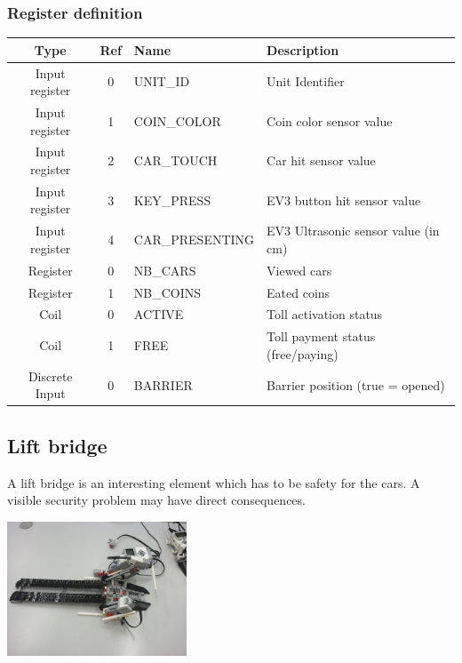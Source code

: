 \documentclass[10pt,a4paper]{article}
\begin{document}
	    \subsubsection{Register definition}
		
			\begin{tabular}{|c|c|l|l|}
			\hline 
			\textbf{Type} & \textbf{Ref} & \textbf{Name} & \textbf{Description} \\ 
			\hline 
			Input register & 0 & UNIT\_ID & Unit Identifier\\ 
			\hline 
			Input register & 1 & COIN\_COLOR & Coin color sensor value\\ 
			\hline 
			Input register & 2 & CAR\_TOUCH & Car hit sensor value\\ 
			\hline 
			Input register & 3 & KEY\_PRESS & EV3 button hit sensor value\\ 
			\hline 
			Input register & 4 & CAR\_PRESENTING & EV3 Ultrasonic sensor value (in cm)\\ 
			\hline 
			Register & 0 & NB\_CARS & Viewed cars\\ 
			\hline 
			Register & 1 & NB\_COINS & Eated coins\\ 
			\hline 
			Coil & 0 & ACTIVE & Toll activation status \\ 
			\hline 
			Coil & 1 & FREE & Toll payment status (free/paying) \\ 
			\hline 
			Discrete Input & 0 & BARRIER & Barrier position (true = opened) \\ 
			\hline 
			\end{tabular} 
		
	\subsection{Lift bridge}
	A lift bridge is an interesting element which has to be safety for the cars. A visible security problem may have direct consequences.
	
	\begin{center}
	\includegraphics[height=4cm]{rsrc/Bridge_02.jpg}
	\end{center}
	
\end{document}
